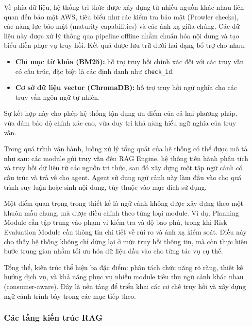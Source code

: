 Về phía dữ liệu, hệ thống tri thức được xây dựng từ nhiều nguồn khác nhau liên quan đến bảo mật AWS, tiêu biểu như các kiểm tra bảo mật (Prowler checks), các năng lực bảo mật (maturity capabilities) và các ánh xạ giữa chúng. Các dữ liệu này được xử lý thông qua pipeline offline nhằm chuẩn hóa nội dung và tạo biểu diễn phục vụ truy hồi. Kết quả được lưu trữ dưới hai dạng bổ trợ cho nhau:

\begin{itemize}
    \item \textbf{Chỉ mục từ khóa (BM25):} hỗ trợ truy hồi chính xác đối với các truy vấn có cấu trúc, đặc biệt là các định danh như \texttt{check\_id}.
    
    \item \textbf{Cơ sở dữ liệu vector (ChromaDB):} hỗ trợ truy hồi ngữ nghĩa cho các truy vấn ngôn ngữ tự nhiên.
\end{itemize}

Sự kết hợp này cho phép hệ thống tận dụng ưu điểm của cả hai phương pháp, vừa đảm bảo độ chính xác cao, vừa duy trì khả năng hiểu ngữ nghĩa của truy vấn.

Trong quá trình vận hành, luồng xử lý tổng quát của hệ thống có thể được mô tả như sau: các module gửi truy vấn đến RAG Engine, hệ thống tiến hành phân tích và truy hồi dữ liệu từ các nguồn tri thức, sau đó xây dựng một tập ngữ cảnh có cấu trúc và trả về cho agent. Agent sử dụng ngữ cảnh này làm đầu vào cho quá trình suy luận hoặc sinh nội dung, tùy thuộc vào mục đích sử dụng.

Một điểm quan trọng trong thiết kế là ngữ cảnh không được xây dựng theo một khuôn mẫu chung, mà được điều chỉnh theo từng loại module. Ví dụ, Planning Module cần tập trung vào phạm vi kiểm tra và độ bao phủ, trong khi Risk Evaluation Module cần thông tin chi tiết về rủi ro và ánh xạ kiểm soát. Điều này cho thấy hệ thống không chỉ dừng lại ở mức truy hồi thông tin, mà còn thực hiện bước trung gian nhằm tối ưu hóa dữ liệu đầu vào cho từng tác vụ cụ thể.

Tổng thể, kiến trúc thể hiện ba đặc điểm: phân tách chức năng rõ ràng, thiết kế hướng dịch vụ, và khả năng phục vụ nhiều module tiêu thụ ngữ cảnh khác nhau (consumer-aware). Đây là nền tảng để triển khai các cơ chế truy hồi và xây dựng ngữ cảnh trình bày trong các mục tiếp theo.

\subsubsection*{Các tầng kiến trúc RAG}

